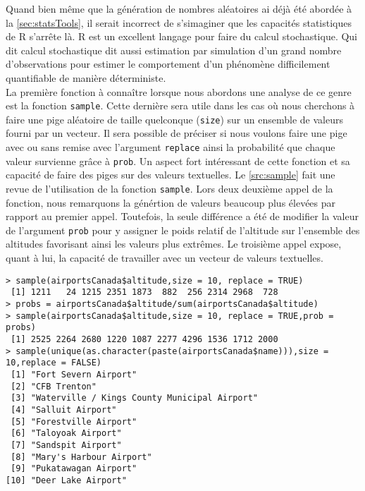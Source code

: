 Quand bien même que la génération de nombres aléatoires ai déjà été abordée à la \autoref{sec:statsTools}, il serait incorrect de s'simaginer que les capacités statistiques de R s'arrête là. R est un excellent langage pour faire du calcul stochastique. Qui dit calcul stochastique dit aussi estimation par simulation d'un grand nombre d'observations pour estimer le comportement d'un phénomène difficilement quantifiable de manière déterministe. \\

La première fonction à connaître lorsque nous abordons une analyse de ce genre est la fonction \texttt{sample}. Cette dernière sera utile dans les cas où nous cherchons à faire une pige aléatoire de taille quelconque (\texttt{size}) sur un ensemble de valeurs fourni par un vecteur. Il sera possible de préciser si nous voulons faire une pige avec ou sans remise avec l'argument \texttt{replace} ainsi la probabilité que chaque valeur survienne grâce à \texttt{prob}. Un aspect fort intéressant de cette fonction et sa capacité de faire des piges sur des valeurs textuelles. Le \autoref{src:sample} fait une revue de l'utilisation de la fonction \texttt{sample}. Lors deux deuxième appel de la fonction, nous remarquons la génértion de valeurs beaucoup plus élevées par rapport au premier appel. Toutefois, la seule différence a été de modifier la valeur de l'argument \texttt{prob} pour y assigner le poids relatif de l'altitude sur l'ensemble des altitudes favorisant ainsi les valeurs plus extrêmes. Le troisième appel expose, quant à lui, la capacité de travailler avec un vecteur de valeurs textuelles. \\

\begin{lstlisting}[caption = Pige aléatoire sur support vectoriel,label=src:sample]
> sample(airportsCanada$altitude,size = 10, replace = TRUE)
 [1] 1211   24 1215 2351 1873  882  256 2314 2968  728
> probs = airportsCanada$altitude/sum(airportsCanada$altitude)
> sample(airportsCanada$altitude,size = 10, replace = TRUE,prob = probs)
 [1] 2525 2264 2680 1220 1087 2277 4296 1536 1712 2000
> sample(unique(as.character(paste(airportsCanada$name))),size = 10,replace = FALSE)
 [1] "Fort Severn Airport"                        
 [2] "CFB Trenton"                                
 [3] "Waterville / Kings County Municipal Airport"
 [4] "Salluit Airport"                            
 [5] "Forestville Airport"                        
 [6] "Taloyoak Airport"                           
 [7] "Sandspit Airport"                           
 [8] "Mary's Harbour Airport"                     
 [9] "Pukatawagan Airport"                        
[10] "Deer Lake Airport"
\end{lstlisting}

